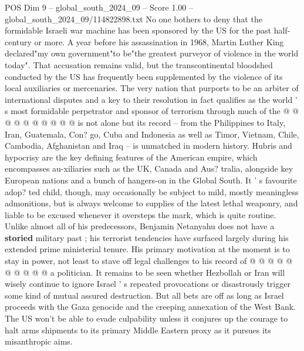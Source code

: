 \begin{textsample}{POS Dim 9 – global\_south\_2024\_09 – Score 1.00 – global\_south\_2024\_09/114822898.txt}
No one bothers to deny that the formidable Israeli war machine has been sponsored by the US for the past half-century or more.
A year before his assassination in 1968, Martin Luther King declared"my own government"to be"the greatest purveyor of violence in the world today".
That accusation remains valid, but the transcontinental bloodshed conducted by the US has frequently been supplemented by the violence of its local auxiliaries or mercenaries.
The very nation that purports to be an arbiter of international disputes and a key to their resolution in fact qualifies as the world ' s most formidable perpetrator and sponsor of terrorism through much of the @ @ @ @ @ @ @ @ @ @ is not alone but its record -- from the Philippines to Italy, Iran, Guatemala, Con? go, Cuba and Indonesia as well as Timor, Vietnam, Chile, Cambodia, Afghanistan and Iraq -- is unmatched in modern history.
Hubris and hypocrisy are the key defining features of the American empire, which encompasses au-xiliaries such as the UK, Canada and Aus? tralia, alongside key European nations and a bunch of hangers-on in the Global South.
It ' s favourite adop? ted child, though, may occasionally be subject to mild, mostly meaningless admonitions, but is always welcome to supplies of the latest lethal weaponry, and liable to be excused whenever it oversteps the mark, which is quite routine.
Unlike almost all of his predecessors, Benjamin Netanyahu does not have a \textbf{storied} military past ; his terrorist tendencies have surfaced largely during his extended prime ministerial tenure.
His primary motivation at the moment is to stay in power, not least to stave off legal challenges to his record of @ @ @ @ @ @ @ @ @ @ a politician.
It remains to be seen whether Hezbollah or Iran will wisely continue to ignore Israel ' s repeated provocations or disastrously trigger some kind of mutual assured destruction.
But all bets are off as long as Israel proceeds with the Gaza genocide and the creeping annexation of the West Bank.
The US won't be able to evade culpability unless it conjures up the courage to halt arms shipments to its primary Middle Eastern proxy as it pursues its misanthropic aims.

\end{textsample}
